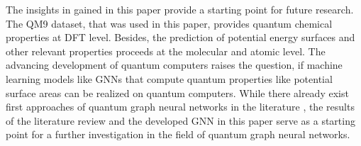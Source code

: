 The insights in gained in this paper provide a starting point for future research. The QM9 dataset, that was used in this paper, provides quantum chemical properties at DFT level. Besides, the prediction of potential energy surfaces and other relevant properties proceeds at the molecular and atomic level. The advancing development of quantum computers raises the question, if machine learning models like GNNs that compute quantum properties like potential surface areas can be realized on quantum computers. While there already exist first approaches of quantum graph neural networks in the literature \cite{verdon_quantum_2019,beer_quantum_2021,ai_decompositional_2023}, the results of the literature review and the developed GNN in this paper serve as a starting point for a further investigation in the field of quantum graph neural networks. 

